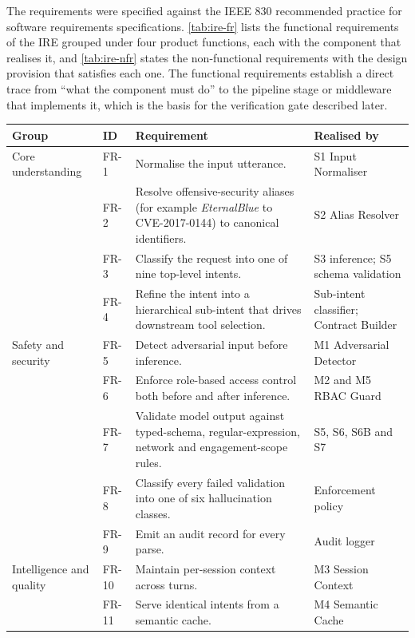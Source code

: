 The requirements were specified against the IEEE 830 recommended practice for
software requirements specifications. \cref{tab:ire-fr} lists the functional
requirements of the IRE grouped under four product functions, each with the
component that realises it, and \cref{tab:ire-nfr} states the non-functional
requirements with the design provision that satisfies each one. The functional
requirements establish a direct trace from ``what the component must do'' to the
pipeline stage or middleware that implements it, which is the basis for the
verification gate described later.

\begin{table}[htbp]
  \centering
  \begin{tabular}{@{}p{}p{}p{}p{}@{}}
    \toprule
    \textbf{Group} & \textbf{ID} & \textbf{Requirement} & \textbf{Realised by}\\
    \midrule
    Core understanding & FR-1 & Normalise the input utterance. & S1 Input Normaliser\\
    & FR-2 & Resolve offensive-security aliases (for example \emph{EternalBlue} to CVE-2017-0144) to canonical identifiers. & S2 Alias Resolver\\
    & FR-3 & Classify the request into one of nine top-level intents. & S3 inference; S5 schema validation\\
    & FR-4 & Refine the intent into a hierarchical sub-intent that drives downstream tool selection. & Sub-intent classifier; Contract Builder\\
    Safety and security & FR-5 & Detect adversarial input before inference. & M1 Adversarial Detector\\
    & FR-6 & Enforce role-based access control both before and after inference. & M2 and M5 RBAC Guard\\
    & FR-7 & Validate model output against typed-schema, regular-expression, network and engagement-scope rules. & S5, S6, S6B and S7\\
    & FR-8 & Classify every failed validation into one of six hallucination classes. & Enforcement policy\\
    & FR-9 & Emit an audit record for every parse. & Audit logger\\
    Intelligence and quality & FR-10 & Maintain per-session context across turns. & M3 Session Context\\
    & FR-11 & Serve identical intents from a semantic cache. & M4 Semantic Cache\\

\end{tabular}
\end{table}
